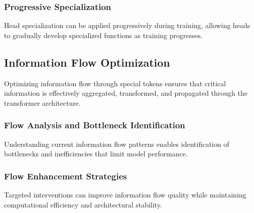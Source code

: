 \subsubsection{Progressive Specialization}

Head specialization can be applied progressively during training, allowing heads to gradually develop specialized functions as training progresses.

\subsection{Information Flow Optimization}

Optimizing information flow through special tokens ensures that critical information is effectively aggregated, transformed, and propagated through the transformer architecture.

\subsubsection{Flow Analysis and Bottleneck Identification}

Understanding current information flow patterns enables identification of bottlenecks and inefficiencies that limit model performance.

\subsubsection{Flow Enhancement Strategies}

Targeted interventions can improve information flow quality while maintaining computational efficiency and architectural stability.